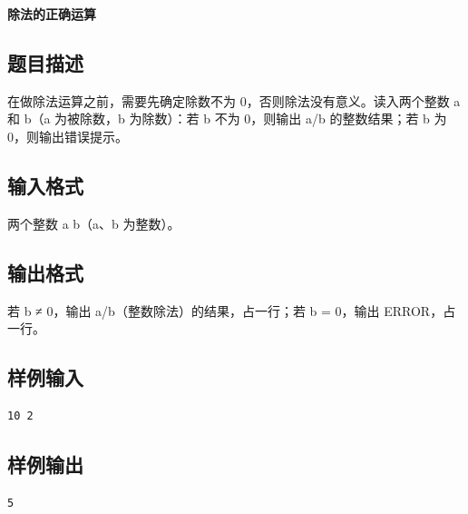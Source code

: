 \documentclass{article}
\newcommand{\problemname}[1]{\begin{center}\Large\bfseries #1\end{center}}
\begin{document}
\problemname{除法的正确运算}

\subsection*{题目描述}
在做除法运算之前，需要先确定除数不为 0，否则除法没有意义。读入两个整数 a 和 b（a 为被除数，b 为除数）：若 b 不为 0，则输出 a/b 的整数结果；若 b 为 0，则输出错误提示。

\subsection*{输入格式}
两个整数 a b（a、b 为整数）。

\subsection*{输出格式}
若 b ≠ 0，输出 a/b（整数除法）的结果，占一行；若 b = 0，输出 ERROR，占一行。

\subsection*{样例输入}
\begin{verbatim}
10 2
\end{verbatim}

\subsection*{样例输出}
\begin{verbatim}
5
\end{verbatim}
\end{document}
